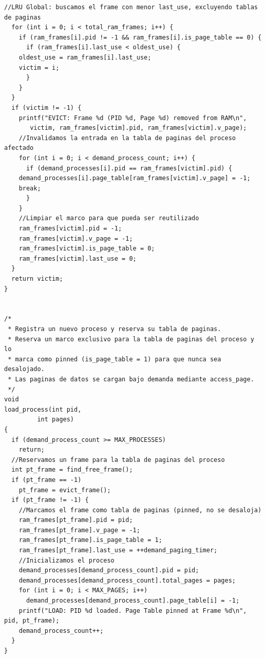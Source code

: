 \documentclass[12pt,letterpaper]{article}
\begin{document}
\begin{lstlisting}[style=modernc, caption={Implementación paging on demand \texttt{paging\_on\_demand.c}}]
  //LRU Global: buscamos el frame con menor last_use, excluyendo tablas de paginas
  for (int i = 0; i < total_ram_frames; i++) {
    if (ram_frames[i].pid != -1 && ram_frames[i].is_page_table == 0) {
      if (ram_frames[i].last_use < oldest_use) {
	oldest_use = ram_frames[i].last_use;
	victim = i;
      }
    }
  }  
  if (victim != -1) {
    printf("EVICT: Frame %d (PID %d, Page %d) removed from RAM\n",
	   victim, ram_frames[victim].pid, ram_frames[victim].v_page);
    //Invalidamos la entrada en la tabla de paginas del proceso afectado
    for (int i = 0; i < demand_process_count; i++) {
      if (demand_processes[i].pid == ram_frames[victim].pid) {
	demand_processes[i].page_table[ram_frames[victim].v_page] = -1;
	break;
      }
    }
    //Limpiar el marco para que pueda ser reutilizado
    ram_frames[victim].pid = -1;
    ram_frames[victim].v_page = -1;
    ram_frames[victim].is_page_table = 0;
    ram_frames[victim].last_use = 0;
  }  
  return victim;
}


/*
 * Registra un nuevo proceso y reserva su tabla de paginas.
 * Reserva un marco exclusivo para la tabla de paginas del proceso y lo
 * marca como pinned (is_page_table = 1) para que nunca sea desalojado.
 * Las paginas de datos se cargan bajo demanda mediante access_page.
 */
void
load_process(int pid,
	     int pages)
{
  if (demand_process_count >= MAX_PROCESSES)
    return;
  //Reservamos un frame para la tabla de paginas del proceso
  int pt_frame = find_free_frame();
  if (pt_frame == -1)
    pt_frame = evict_frame();
  if (pt_frame != -1) {
    //Marcamos el frame como tabla de paginas (pinned, no se desaloja)
    ram_frames[pt_frame].pid = pid;
    ram_frames[pt_frame].v_page = -1;
    ram_frames[pt_frame].is_page_table = 1;
    ram_frames[pt_frame].last_use = ++demand_paging_timer;
    //Inicializamos el proceso
    demand_processes[demand_process_count].pid = pid;
    demand_processes[demand_process_count].total_pages = pages;
    for (int i = 0; i < MAX_PAGES; i++)
      demand_processes[demand_process_count].page_table[i] = -1;
    printf("LOAD: PID %d loaded. Page Table pinned at Frame %d\n", pid, pt_frame);
    demand_process_count++;
  }
}


\end{lstlisting}
\end{document}
